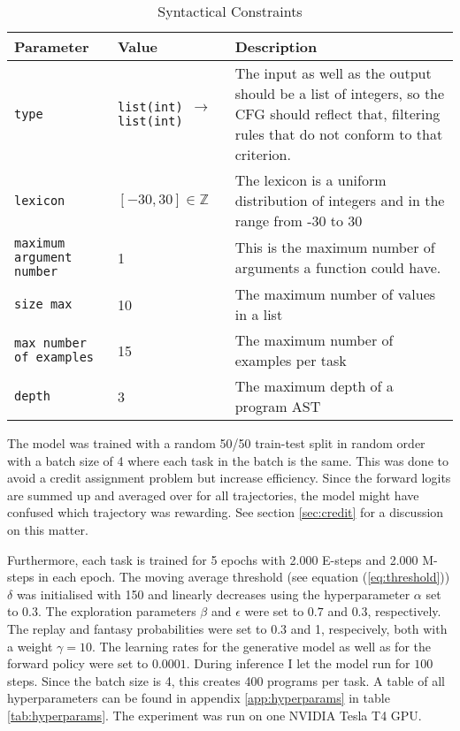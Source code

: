 \begin{table}[H]
    \centering
    \begin{tabularx}{\textwidth}{|l|l|X|}
        \hline
        \textbf{Parameter} & \textbf{Value} & \textbf{Description} \\\hline
        \texttt{type} & \texttt{list(int) $\rightarrow$ list(int)} & The input as well as the output should be a list of integers, so the CFG should reflect that, filtering rules that do not conform to that criterion. \\\hline
        \texttt{lexicon} &  $[-30, 30] \in \mathbb{Z}$ & The lexicon is a uniform distribution of integers and in the range from -30 to 30 \\\hline
        \texttt{maximum argument number} & 1 & This is the maximum number of arguments a function could have. \\\hline
        \texttt{size max} & 10 & The maximum number of values in a list \\\hline 
        \texttt{max number of examples} & 15 & The maximum number of examples per task \\\hline 
        \texttt{depth} & 3 & The maximum depth of a program AST \\\hline 
    \end{tabularx}
    \caption{Syntactical Constraints}
    \label{tab:synconst}
\end{table}

The model was trained with a random 50/50 train-test split in random order with a batch size of 4 where each task in the batch is the same. This was done to avoid a credit assignment problem but increase efficiency. Since the forward logits are summed up and averaged over for all trajectories, the model might have confused which trajectory was rewarding. See section \ref{sec:credit} for a discussion on this matter.

Furthermore, each task is trained for 5 epochs with 2.000 E-steps and 2.000 M-steps in each epoch. The moving average threshold (see equation (\ref{eq:threshold})) $\delta$ was initialised with 150 and linearly decreases using the hyperparameter $\alpha$ set to 0.3. The exploration parameters $\beta$ and $\epsilon$ were set to $0.7$ and $0.3$, respectively. The replay and fantasy probabilities were set to 0.3 and 1, respecively, both with a weight $\gamma = 10$. The learning rates for the generative model as well as for the forward policy were set to $0.0001$. During inference I let the model run for $100$ steps. Since the batch size is 4, this creates 400 programs per task. A table of all hyperparameters can be found in appendix \ref{app:hyperparams} in table \ref{tab:hyperparams}. The experiment was run on one NVIDIA Tesla T4 GPU.





